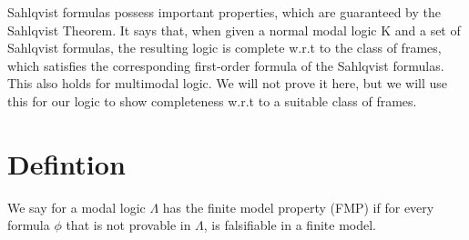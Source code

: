 \documentclass[12pt, a4paper]{scrreprt}
\begin{document}
Sahlqvist formulas possess important properties, which are guaranteed by the Sahlqvist Theorem. It says that, when given a normal modal logic K and a set of Sahlqvist formulas, the resulting logic is complete w.r.t 
to the class of frames, which satisfies the corresponding first-order formula of the Sahlqvist formulas. This also holds for multimodal logic. We will not prove it here, but we will use this
for our logic to show completeness w.r.t to a suitable class of frames.
\newline

\section{Defintion}
We say for a modal logic $\Lambda$ has the finite model property (FMP) if for every formula $\phi$ that is not provable in $\Lambda$,
is falsifiable in a finite model.
\end{document}
